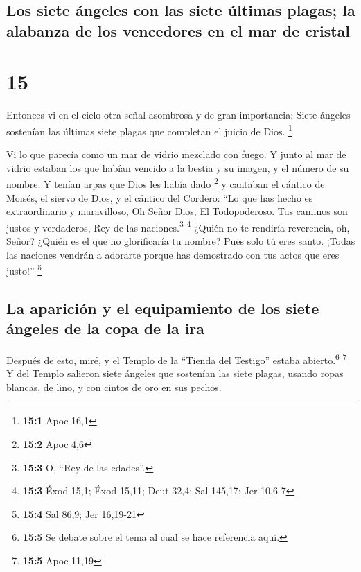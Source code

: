 \hypertarget{los-siete-uxe1ngeles-con-las-siete-uxfaltimas-plagas-la-alabanza-de-los-vencedores-en-el-mar-de-cristal}{%
\subsection{Los siete ángeles con las siete últimas plagas; la alabanza
de los vencedores en el mar de
cristal}\label{los-siete-uxe1ngeles-con-las-siete-uxfaltimas-plagas-la-alabanza-de-los-vencedores-en-el-mar-de-cristal}}

\hypertarget{section-14}{%
\section{15}\label{section-14}}

 Entonces vi en el cielo otra señal asombrosa y de gran
importancia: Siete ángeles sostenían las últimas siete plagas que
completan el juicio de Dios. \footnote{\textbf{15:1} Apoc 16,1}

 Vi lo que parecía como un mar de vidrio mezclado con
fuego. Y junto al mar de vidrio estaban los que habían vencido a la
bestia y su imagen, y el número de su nombre. Y tenían arpas que Dios
les había dado \footnote{\textbf{15:2} Apoc 4,6}  y
cantaban el cántico de Moisés, el siervo de Dios, y el cántico del
Cordero: ``Lo que has hecho es extraordinario y maravilloso, Oh Señor
Dios, El Todopoderoso. Tus caminos son justos y verdaderos, Rey de las
naciones.\footnote{\textbf{15:3} O, ``Rey de las edades''.} \footnote{\textbf{15:3}
  Éxod 15,1; Éxod 15,11; Deut 32,4; Sal 145,17; Jer 10,6-7}
 ¿Quién no te rendiría reverencia, oh, Señor? ¿Quién es el
que no glorificaría tu nombre? Pues solo tú eres santo. ¡Todas las
naciones vendrán a adorarte porque has demostrado con tus actos que eres
justo!'' \footnote{\textbf{15:4} Sal 86,9; Jer 16,19-21}

\hypertarget{la-apariciuxf3n-y-el-equipamiento-de-los-siete-uxe1ngeles-de-la-copa-de-la-ira}{%
\subsection{La aparición y el equipamiento de los siete ángeles de la
copa de la
ira}\label{la-apariciuxf3n-y-el-equipamiento-de-los-siete-uxe1ngeles-de-la-copa-de-la-ira}}

 Después de esto, miré, y el Templo de la ``Tienda del
Testigo'' estaba abierto.\footnote{\textbf{15:5} Se debate sobre el tema
  al cual se hace referencia aquí.} \footnote{\textbf{15:5} Apoc 11,19}
 Y del Templo salieron siete ángeles que sostenían las
siete plagas, usando ropas blancas, de lino, y con cintos de oro en sus
pechos.

